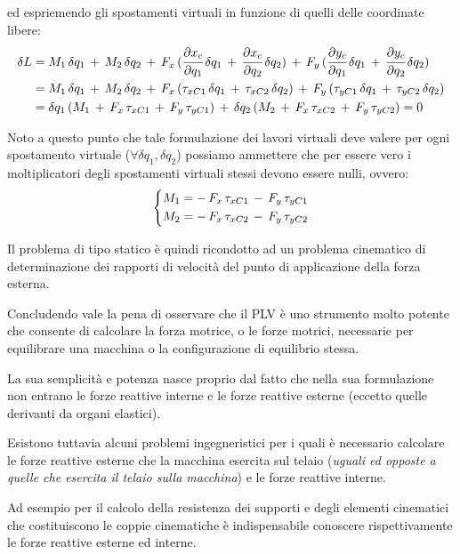 		ed espriemendo gli spostamenti virtuali in funzione di quelli delle coordinate libere:
		\begin{align*}
		\delta L &= M_1\,\delta q_1\,+\,M_2\,\delta q_2\,+\,F_x\,(\cfrac{\partial x_c}{\partial q_1}\,\delta q_1\,+\,\cfrac{\partial x_c}{\partial q_2}\,\delta q_2)\,+\,F_y\,(\cfrac{\partial y_c}{\partial q_1}\,\delta q_1\,+\,\cfrac{\partial y_c}{\partial q_2}\,\delta q_2)\\
		&= M_1\,\delta q_1\,+\,M_2\,\delta q_2\,+\,F_x\,(\tau_{xC1}\,\delta q_1\,+\,\tau_{xC2}\,\delta q_2)\,+\,F_y\,(\tau_{yC1}\,\delta q_1\,+\,\tau_{yC2}\,\delta q_2)\\
		&= \delta q_1\,(M_1\,+\,F_x\,\tau_{xC1}\,+\,F_y\,\tau_{yC1})\,+\,\delta q_2\,(M_2\,+\,F_x\,\tau_{xC2}\,+\,F_y\,\tau_{yC2}) = 0
		\end{align*}
		
		Noto a questo punto che tale formulazione dei lavori virtuali deve valere per ogni spostamento virtuale ($\forall \delta q_1, \delta q_2$) possiamo ammettere che per essere vero i moltiplicatori degli spostamenti virtuali stessi devono essere nulli, ovvero:
		\[
		\begin{dcases}
			M_1 = -\,F_x\,\tau_{xC1}\,-\,F_y\,\tau_{yC1}\\
			M_2 = -\,F_x\,\tau_{xC2}\,-\,F_y\,\tau_{yC2}
		\end{dcases}
		\]

	Il problema di tipo statico è quindi ricondotto ad un problema cinematico di determinazione dei rapporti di velocità del punto di applicazione della forza esterna.
	
	Concludendo vale la pena di osservare che il PLV è uno strumento molto potente che consente di calcolare la forza motrice, o le forze motrici, necessarie per equilibrare una macchina o la configurazione di equilibrio stessa.
	
	La sua semplicità e potenza nasce proprio dal fatto che nella sua formulazione non entrano le forze reattive interne e le forze reattive esterne (eccetto quelle derivanti da organi elastici).
	
	Esistono tuttavia alcuni problemi ingegneristici per i quali è necessario calcolare le forze reattive esterne che la macchina esercita sul telaio (\emph{uguali ed opposte a quelle che esercita il telaio sulla macchina}) e le forze reattive interne.
	
	Ad esempio per il calcolo della resistenza dei supporti e degli elementi cinematici che costituiscono le coppie cinematiche è indispensabile conoscere rispettivamente le forze reattive esterne ed interne.
	
